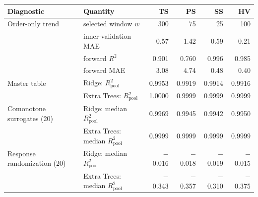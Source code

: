 \begin{tabular}{@{}llrrrr@{}}
\toprule
Diagnostic & Quantity & TS & PS & SS & HV \\
\midrule
Order-only trend & selected window $w$ & 300 & 75 & 25 & 100 \\
 & inner-validation MAE & 0.57 & 1.42 & 0.59 & 0.21 \\
 & forward $R^2$ & 0.901 & 0.760 & 0.996 & 0.985 \\
 & forward MAE & 3.08 & 4.74 & 0.48 & 0.40 \\
\midrule
Master table & Ridge: $R^2_{\mathrm{pool}}$ & 0.9953 & 0.9919 & 0.9914 & 0.9916 \\
 & Extra Trees: $R^2_{\mathrm{pool}}$ & 1.0000 & 0.9999 & 0.9999 & 0.9999 \\
Comonotone surrogates (20) & Ridge: median $R^2_{\mathrm{pool}}$ & 0.9969 & 0.9945 & 0.9942 & 0.9950 \\
 & Extra Trees: median $R^2_{\mathrm{pool}}$ & 0.9999 & 0.9999 & 0.9999 & 0.9999 \\
Response randomization (20) & Ridge: median $R^2_{\mathrm{pool}}$ & $-$0.016 & $-$0.018 & $-$0.019 & $-$0.015 \\
 & Extra Trees: median $R^2_{\mathrm{pool}}$ & $-$0.343 & $-$0.357 & $-$0.310 & $-$0.375 \\
\bottomrule
\end{tabular}
